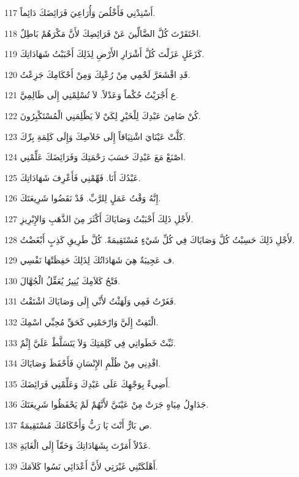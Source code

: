 \par 117 أَسْنِدْنِي فَأَخْلُصَ وَأُرَاعِيَ فَرَائِضَكَ دَائِماً.
\par 118 احْتَقَرْتَ كُلَّ الضَّالِّينَ عَنْ فَرَائِضِكَ لأَنَّ مَكْرَهُمْ بَاطِلٌ.
\par 119 كَزَغَلٍ عَزَلْتَ كُلَّ أَشْرَارِ الأَرْضِ لِذَلِكَ أَحْبَبْتُ شَهَادَاتِكَ.
\par 120 قَدِ اقْشَعَرَّ لَحْمِي مِنْ رُعْبِكَ وَمِنْ أَحْكَامِكَ جَزِعْتُ.
\par 121 ع أَجْرَيْتُ حُكْماً وَعَدْلاً. لاَ تُسْلِمْنِي إِلَى ظَالِمِيَّ.
\par 122 كُنْ ضَامِنَ عَبْدِكَ لِلْخَيْرِ لِكَيْ لاَ يَظْلِمَنِي الْمُسْتَكْبِرُونَ.
\par 123 كَلَّتْ عَيْنَايَ اشْتِيَاقاً إِلَى خَلاَصِكَ وَإِلَى كَلِمَةِ بِرِّكَ.
\par 124 اصْنَعْ مَعَ عَبْدِكَ حَسَبَ رَحْمَتِكَ وَفَرَائِضَكَ عَلِّمْنِي.
\par 125 عَبْدُكَ أَنَا. فَهِّمْنِي فَأَعْرِفَ شَهَادَاتِكَ.
\par 126 إِنَّهُ وَقْتُ عَمَلٍ لِلرَّبِّ. قَدْ نَقَضُوا شَرِيعَتَكَ.
\par 127 لأَجْلِ ذَلِكَ أَحْبَبْتُ وَصَايَاكَ أَكْثَرَ مِنَ الذَّهَبِ وَالإِبْرِيزِ.
\par 128 لأَجْلِ ذَلِكَ حَسِبْتُ كُلَّ وَصَايَاكَ فِي كُلِّ شَيْءٍ مُسْتَقِيمَةً. كُلَّ طَرِيقِ كَذِبٍ أَبْغَضْتُ.
\par 129 ف عَجِيبَةٌ هِيَ شَهَادَاتُكَ لِذَلِكَ حَفِظَتْهَا نَفْسِي.
\par 130 فَتْحُ كَلاَمِكَ يُنِيرُ يُعَقِّلُ الْجُهَّالَ.
\par 131 فَغَرْتُ فَمِي وَلَهَثْتُ لأَنِّي إِلَى وَصَايَاكَ اشْتَقْتُ.
\par 132 الْتَفِتْ إِلَيَّ وَارْحَمْنِي كَحَقِّ مُحِبِّي اسْمِكَ.
\par 133 ثَبِّتْ خَطَواتِي فِي كَلِمَتِكَ وَلاَ يَتَسَلَّطْ عَلَيَّ إِثْمٌ.
\par 134 افْدِنِي مِنْ ظُلْمِ الإِنْسَانِ فَأَحْفَظَ وَصَايَاكَ.
\par 135 أَضِيءْ بِوَجْهِكَ عَلَى عَبْدِكَ وَعَلِّمْنِي فَرَائِضَكَ.
\par 136 جَدَاوِلُ مِيَاهٍ جَرَتْ مِنْ عَيْنَيَّ لأَنَّهُمْ لَمْ يَحْفَظُوا شَرِيعَتَكَ.
\par 137 ص بَارٌّ أَنْتَ يَا رَبُّ وَأَحْكَامُكَ مُسْتَقِيمَةٌ.
\par 138 عَدْلاً أَمَرْتَ بِشَهَادَاتِكَ وَحَقّاً إِلَى الْغَايَةِ.
\par 139 أَهْلَكَتْنِي غَيْرَتِي لأَنَّ أَعْدَائِي نَسُوا كَلاَمَكَ.
